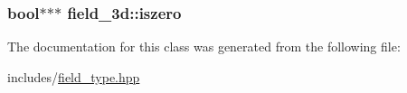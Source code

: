\subsubsection[{\texorpdfstring{iszero}{iszero}}]{\setlength{\rightskip}{0pt plus 5cm}bool$\ast$$\ast$$\ast$ field\+\_\+3d\+::iszero\hspace{0.3cm}{\ttfamily [protected]}}\hypertarget{classfield__3d_a024d0b7a17147d4955337f54078a8c86}{}\label{classfield__3d_a024d0b7a17147d4955337f54078a8c86}


The documentation for this class was generated from the following file\+:\begin{DoxyCompactItemize}
\item 
includes/\hyperlink{field__type_8hpp}{field\+\_\+type.\+hpp}\end{DoxyCompactItemize}
